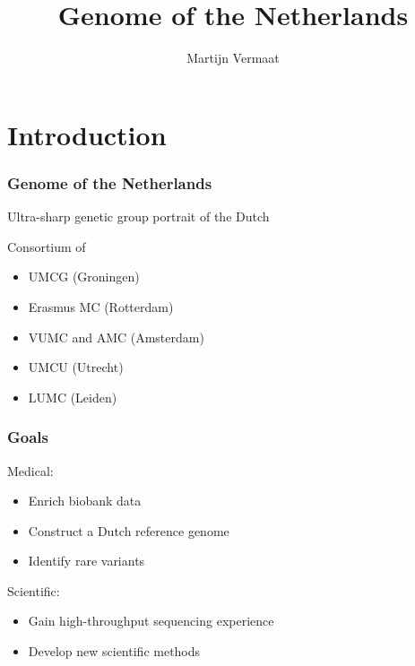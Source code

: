 \documentclass[slidestop,14pt]{beamer}
\title{Genome of the Netherlands}
\author{Martijn Vermaat}
\begin{document}

\bodytemplate


\section{Introduction}


\begin{frame}
  \frametitle{Genome of the Netherlands}

  \vspace{\baselineskip}

  Ultra-sharp genetic group portrait of the Dutch

  \pause

  \vspace{\baselineskip}

  Consortium of
  \begin{itemize}
    \item UMCG (Groningen)
    \item Erasmus MC (Rotterdam)
    \item VUMC and AMC (Amsterdam)
    \item UMCU (Utrecht)
    \item LUMC (Leiden)
  \end{itemize}
\end{frame}

\begin{frame}
  \frametitle{Goals}

  \vspace{\baselineskip}

  Medical:
  \begin{itemize}
    \item Enrich biobank data
    \item Construct a Dutch reference genome
    \item Identify rare variants
  \end{itemize}

  \vspace{\baselineskip}

  Scientific:
  \begin{itemize}
    \item Gain high-throughput sequencing experience
    \item Develop new scientific methods
  \end{itemize}
\end{frame}
\end{document}
